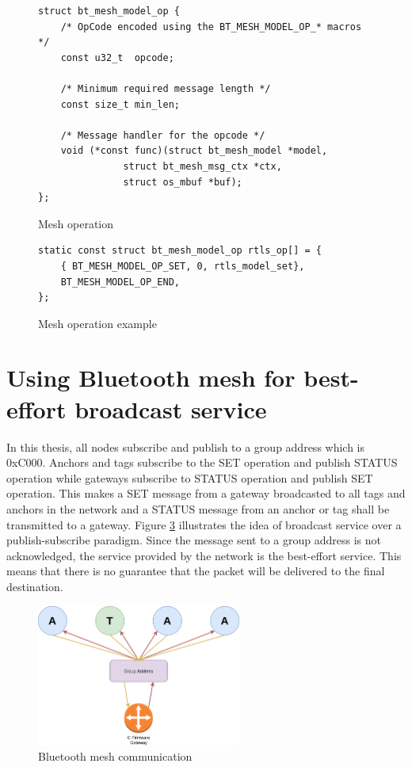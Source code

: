 \documentclass[\main/main.tex]{subfiles}
\begin{document}
\begin{figure}[H]
    \begin{lstlisting}[style=CStyle]
struct bt_mesh_model_op {
	/* OpCode encoded using the BT_MESH_MODEL_OP_* macros */
	const u32_t  opcode;

	/* Minimum required message length */
	const size_t min_len;

	/* Message handler for the opcode */
	void (*const func)(struct bt_mesh_model *model,
			   struct bt_mesh_msg_ctx *ctx,
			   struct os_mbuf *buf);
};
    \end{lstlisting}
    \caption{Mesh operation}
    \label{fig:mesh_model_operation}
\end{figure}

\begin{figure}[H]
    \begin{lstlisting}[style=CStyle]
static const struct bt_mesh_model_op rtls_op[] = {
    { BT_MESH_MODEL_OP_SET, 0, rtls_model_set},
    BT_MESH_MODEL_OP_END,
};
\end{lstlisting}
\caption{Mesh operation example}
\label{fig:mesh_model_operation_example}
\end{figure}

\section{Using Bluetooth mesh for best-effort broadcast service}
\label{sec:using_bluetooth_mesh_for_best_effort_broadcast_service}
In this thesis, all nodes subscribe and publish to a group address which is 0xC000. Anchors and tags subscribe to the SET operation and publish STATUS operation while gateways subscribe to STATUS operation and publish SET operation. This makes a SET message from a gateway broadcasted to all tags and anchors in the network and a STATUS message from an anchor or tag shall be transmitted to a gateway. Figure \ref{fig:ble_mesh_comunication} illustrates the idea of broadcast service over a publish-subscribe paradigm. Since the message sent to a group address is not acknowledged, the service provided by the network is the best-effort service. This means that there is no guarantee that the packet will be delivered to the final destination. 

\begin{figure}[H]
    \begin{center}
        \includegraphics[width=0.6\textwidth]{ble_mesh_comunication.png}
    \end{center}
    \caption{Bluetooth mesh communication}
    \label{fig:ble_mesh_comunication}
\end{figure}
\end{document}
